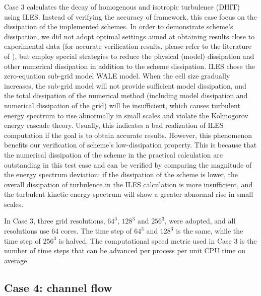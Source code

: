 \documentclass{article}
\begin{document}
Case 3 calculates the decay of homogenous and isotropic turbulence (DHIT) using ILES. Instead of verifying the accuracy of framework, this case focus on the dissipation of the implemented schemes. In order to demonstrate scheme's dissipation, we did not adopt optimal settings aimed at obtaining results close to experimental data (for accurate verification results, please refer to the literature of \citet{Guo:2023:arXiv}), but employ special strategies to reduce the physical (model) dissipation and other numerical dissipation in addition to the scheme dissipation. ILES chose the zero-equation sub-grid model WALE model. When the cell size gradually increases, the sub-grid model will not provide sufficient model dissipation, and the total dissipation of the numerical method (including model dissipation and numerical dissipation of the grid) will be insufficient, which causes turbulent energy spectrum to rise abnormally in small scales and violate the Kolmogorov energy cascade theory. Usually, this indicates a bad realization of ILES computation if the goal is to obtain accurate results. However, this phenomenon benefits our verification of scheme's low-dissipation property. This is because that the numerical dissipation of the scheme in the practical calculation are outstanding in this test case and can be verified by comparing the magnitude of the energy spectrum deviation: if the dissipation of the scheme is lower, the overall dissipation of turbulence in the ILES calculation is more insufficient, and the turbulent kinetic energy spectrum will show a greater abnormal rise in small scales.

In Case 3, three grid resolutions, $64^3$, $128^3$ and $256^3$, were adopted, and all resolutions use 64 cores. The time step of $64^3$ and $128^3$ is the same, while the time step of $256^3$ is halved. The computational speed metric used in Case 3 is the number of time steps that can be advanced per process per unit CPU time on average.


\subsection{Case 4: channel flow}
\end{document}
